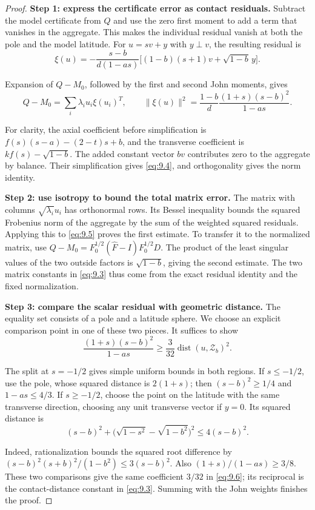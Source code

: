 \begin{proof}
\textbf{Step 1: express the certificate error as contact residuals.} Subtract the model certificate from $Q$ and use the zero first moment to add
a term that vanishes in the aggregate. This makes the individual residual
vanish at both the pole and the model latitude.
For $u=sv+y$ with $y\perp v$, the resulting residual is
\begin{equation}\label{eq:9.4}
\xi(u)=-\frac{s-b}{d(1-as)}
\bigl[(1-b)(s+1)v+\sqrt{1-b}\,y\bigr].
\end{equation}

Expansion of $Q-M_0$, followed by the first and second John moments, gives
\begin{equation}\label{eq:9.5}
Q-M_0=\sum_i\lambda_i u_i\xi(u_i)^T,
\qquad
\|\xi(u)\|^2=\frac{1-b}{d}\frac{(1+s)(s-b)^2}{1-as}.
\end{equation}

For clarity, the axial coefficient before simplification is
$f(s)(s-a)-(2-t)s+b$, and the transverse coefficient is
$kf(s)-\sqrt{1-b}$. The added constant vector $bv$ contributes zero to the aggregate by balance. Their simplification gives \eqref{eq:9.4}, and orthogonality gives the norm identity.

\textbf{Step 2: use isotropy to bound the total matrix error.} The matrix with
columns $\sqrt{\lambda_i}u_i$ has orthonormal rows. Its Bessel inequality
bounds the squared Frobenius norm of the aggregate by the sum of the
weighted squared residuals. Applying this to \eqref{eq:9.5} proves the first estimate.
To transfer it to the normalized matrix, use
$Q-M_0=F_0^{1/2}(\widehat F-I)F_0^{1/2}D$.
The product of the least singular values of the two outside factors is
$\sqrt{1-b}$, giving the second estimate. The two matrix constants in \eqref{eq:9.3}
thus come from the exact residual identity and the fixed normalization.

\textbf{Step 3: compare the scalar residual with geometric distance.}
The equality set consists of a pole and a latitude sphere. We choose an
explicit comparison point in one of these two pieces. It suffices to show
\begin{equation}\label{eq:9.6}
\frac{(1+s)(s-b)^2}{1-as}
\ge\frac3{32}\operatorname{dist}(u,\mathcal Z_b)^2.
\end{equation}

The split at $s=-1/2$ gives simple uniform bounds in both regions.
If $s\le-1/2$, use the pole, whose squared distance is $2(1+s)$;
then $(s-b)^2\ge1/4$ and $1-as\le4/3$.
If $s\ge-1/2$, choose the point on the latitude with the same transverse
direction, choosing any unit transverse vector if $y=0$. Its squared distance is
\begin{equation}\label{eq:9.7}
(s-b)^2+\bigl(\sqrt{1-s^2}-\sqrt{1-b^2}\bigr)^2\le4(s-b)^2.
\end{equation}

Indeed, rationalization bounds the squared root difference by
$(s-b)^2(s+b)^2/(1-b^2)\le3(s-b)^2$.
Also $(1+s)/(1-as)\ge3/8$. These two comparisons give the same coefficient
$3/32$ in \eqref{eq:9.6}; its reciprocal is the contact-distance constant in \eqref{eq:9.3}.
Summing with the John weights finishes the proof. 
\end{proof}

